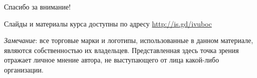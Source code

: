 \documentclass{beamer}
\begin{document}
\begin{frame}

{\huge{Спасибо за внимание!}\par}

\vfill

Слайды и материалы курса доступны по адресу \url{http://is.gd/ivuboc} %

\vfill

\tiny{\textit{Замечание}: все торговые марки и логотипы, использованные в данном материале, являются собственностью их владельцев. Представленная здесь точка зрения отражает личное мнение автора, не выступающего от лица какой-либо организации.}

\end{frame}
\end{document}
